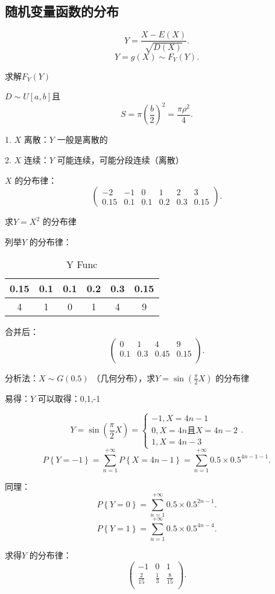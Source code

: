 \subsection{随机变量函数的分布}%
\label{sub:随机变量函数的分布}
\begin{eg}
	 \[
		Y=\frac{X-E\left( X \right) }{\sqrt{D\left( X \right) } }
	.\] 
	\[
		Y=g\left( X \right) \sim F_{Y}\left( Y \right) 
	.\] 

	求解$F_{Y}\left( Y \right) $
\end{eg}
\begin{eg}
	$D\sim U[a,b]$且
	 \[
		S=\pi\left( \frac{b}{2} \right) ^2 = \frac{\pi\rho^2}{4}
	.\] 
\end{eg}
1. $X$ 离散：$Y$ 一般是离散的

2. $X$ 连续：$Y$ 可能连续，可能分段连续（离散）
\begin{eg}
	$X$ 的分布律：
	\[
		\begin{pmatrix}
			-2&-1&0&1&2&3\\
			0.15&0.1&0.1&0.2&0.3&0.15
		\end{pmatrix}
	.\] 

	求$Y=X^2$ 的分布律

	列举$Y$ 的分布律：
	\begin{table}[htpb]
		\centering
		\caption{Y Func}
		\label{tab:Y-Func}
		\begin{tabular}{cccccc}
		\toprule
		0.15 & 0.1 & 0.1 & 0.2 & 0.3 & 0.15\\
		\midrule
		4 & 1 & 0 & 1 & 4 & 9\\
		\bottomrule
		\end{tabular}
	\end{table}
	合并后：
	\[
		\begin{pmatrix}
			0 & 1 & 4 & 9\\
			0.1 & 0.3 & 0.45 & 0.15\\
		\end{pmatrix}
	.\] 
\end{eg}

\begin{eg}
	分析法：$X\sim G\left( 0.5 \right) $ （几何分布），求$Y=\sin\left( {\frac{\pi}{2}}X \right) $ 的分布律

	易得：$Y$ 可以取得：0,1,-1

	\[
		Y=\sin\left( \frac{\pi}{2}X \right) =\begin{cases}
			-1, X=4n-1\\
			0,X=4n\text{且}X=4n-2\\
			1,X=4n-3
		\end{cases}
	.\] 
	\[
		P\left\{ Y=-1 \right\} =\sum_{n=1}^{+\infty} P\left\{ X=4n-1 \right\} =\sum_{n=1}^{+\infty} 0.5\times 0.5^{4n-1-1}
	.\] 

	同理：
	\[
		P\left\{ Y=0 \right\} =\sum_{n=1}^{+\infty} 0.5\times 0.5^{2n-1}
	.\] 
	\[
		P\left\{ Y=1 \right\} =\sum_{n=1}^{+\infty} 0.5\times 0.5^{4n-4}
	.\] 

	求得$Y$ 的分布律：
	\[
		\begin{pmatrix}
			-1 & 0 & 1\\
			{\frac{2}{15}} & {\frac{1}{3}} & {\frac{8}{15}}\\
		\end{pmatrix}
	.\] 
\end{eg}

